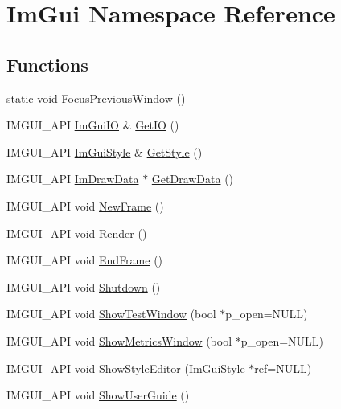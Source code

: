 \hypertarget{namespace_im_gui}{}\section{Im\+Gui Namespace Reference}
\label{namespace_im_gui}
\subsection*{Functions}
\begin{DoxyCompactItemize}
\item 
static void \hyperlink{namespace_im_gui_a71f3fa3da1f6e029fb324d1d41fee0ad}{Focus\+Previous\+Window} ()
\item 
I\+M\+G\+U\+I\+\_\+\+A\+PI \hyperlink{struct_im_gui_i_o}{Im\+Gui\+IO} \& \hyperlink{namespace_im_gui_a3179e560812f878f3961ce803a5d9302}{Get\+IO} ()
\item 
I\+M\+G\+U\+I\+\_\+\+A\+PI \hyperlink{struct_im_gui_style}{Im\+Gui\+Style} \& \hyperlink{namespace_im_gui_abafef4bb3e3654efd96a47b2e22870a7}{Get\+Style} ()
\item 
I\+M\+G\+U\+I\+\_\+\+A\+PI \hyperlink{struct_im_draw_data}{Im\+Draw\+Data} $\ast$ \hyperlink{namespace_im_gui_ab73131dc44b1267dac04f0c2bb0af983}{Get\+Draw\+Data} ()
\item 
I\+M\+G\+U\+I\+\_\+\+A\+PI void \hyperlink{namespace_im_gui_ab3f1fc018f903b7ad79fd10663375774}{New\+Frame} ()
\item 
I\+M\+G\+U\+I\+\_\+\+A\+PI void \hyperlink{namespace_im_gui_ab51a164f547317c16c441f1599e3946d}{Render} ()
\item 
I\+M\+G\+U\+I\+\_\+\+A\+PI void \hyperlink{namespace_im_gui_a246c37da45e88a12ade440a0feacb4ee}{End\+Frame} ()
\item 
I\+M\+G\+U\+I\+\_\+\+A\+PI void \hyperlink{namespace_im_gui_aeba34069558d4fbcf734a9c92ce3b773}{Shutdown} ()
\item 
I\+M\+G\+U\+I\+\_\+\+A\+PI void \hyperlink{namespace_im_gui_a52880ae1ecdd704a083558d31c9bfa50}{Show\+Test\+Window} (bool $\ast$p\+\_\+open=N\+U\+LL)
\item 
I\+M\+G\+U\+I\+\_\+\+A\+PI void \hyperlink{namespace_im_gui_afe7a28c6eb52fff3cc27d5a698fea4ff}{Show\+Metrics\+Window} (bool $\ast$p\+\_\+open=N\+U\+LL)
\item 
I\+M\+G\+U\+I\+\_\+\+A\+PI void \hyperlink{namespace_im_gui_ab2eb3dec78d054fe3feab1c091ec5de5}{Show\+Style\+Editor} (\hyperlink{struct_im_gui_style}{Im\+Gui\+Style} $\ast$ref=N\+U\+LL)
\item 
I\+M\+G\+U\+I\+\_\+\+A\+PI void \hyperlink{namespace_im_gui_ad6f4919bc9aa806ca8d2c1d6e2bfb051}{Show\+User\+Guide} ()

\end{DoxyCompactItemize}
